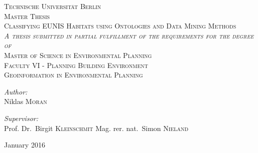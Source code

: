 \begin{titlepage}
\begin{center}

\textsc{\LARGE Technische Universit\"at Berlin}\\[0.5cm]
\textsc{Master Thesis}\\[1.5cm]

\textsc{\Large Classifying EUNIS Habitats using Ontologies and Data Mining
Methods}\\[1.5cm]
\textsc{\textit{A thesis submitted in partial fulfillment of the requirements
for the degree of}}\\[1.25cm]
\textsc{\Large Master of Science in Environmental Planning}\\[1.5cm]
\textsc{Faculty VI - Planning Building Environment\\
 Geoinformation in Environmental Planning}\\[1.5cm] 
\noindent
\begin{minipage}{0.5\textwidth}
\begin{flushleft} \large
\emph{Author:}\\
Niklas \textsc{Moran}
\end{flushleft}
\end{minipage}%
\begin{minipage}{0.5\textwidth}
\begin{flushright} \large
\emph{Supervisor:} \\
Prof. Dr.~Birgit \textsc{Kleinschmit}
Mag. rer. nat.~Simon \textsc{Nieland}
\end{flushright}
\end{minipage}

\vfill

{\large January 2016}

\end{center}
\end{titlepage}
